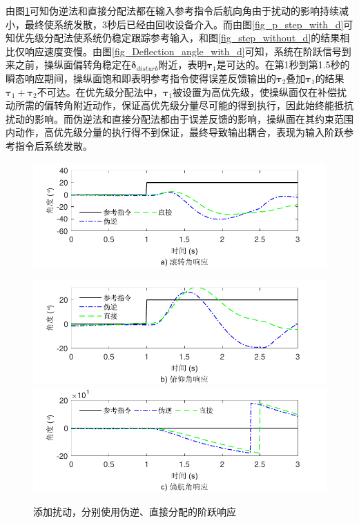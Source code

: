 由图\ref{fig_id_step_with_d}可知伪逆法和直接分配法都在输入参考指令后航向角由于扰动的影响持续减小，最终使系统发散，3秒后已经由回收设备介入。而由图\ref{fig_p_step_with_d}可知优先级分配法使系统仍稳定跟踪参考输入，和图\ref{fig_step_without_d}的结果相比仅响应速度变慢。由图\ref{fig_Deflection_angle_with_d}可知，系统在阶跃信号到来之前，操纵面偏转角稳定在$\bm{\delta }_{disturb}$附近，表明$\bm{\tau}_1$是可达的。在第1秒到第1.5秒的瞬态响应期间，操纵面饱和即表明参考指令使得误差反馈输出的$\bm{\tau}_2$叠加$\bm{\tau}_1$的结果$\bm{\tau}_1+\bm{\tau}_2$不可达。在优先级分配法中，$\bm{\tau}_1$被设置为高优先级，使操纵面仅在补偿扰动所需的偏转角附近动作，保证高优先级分量尽可能的得到执行，因此始终能抵抗扰动的影响。而伪逆法和直接分配法都由于误差反馈的影响，操纵面在其约束范围内动作，高优先级分量的执行得不到保证，最终导致输出耦合，表现为输入阶跃参考指令后系统发散。
\begin{figure}[htbp]
	\centering	
	\includegraphics[scale=1]{Fig/Fig12a.pdf}
\end{figure}
\begin{figure}[htbp]
	\centering	
	\includegraphics[scale=1]{Fig/Fig12b.pdf}
	\includegraphics[scale=1]{Fig/Fig12c.pdf}
	\caption{\label{fig_id_step_with_d}添加扰动，分别使用伪逆、直接分配的阶跃响应}
\end{figure}
